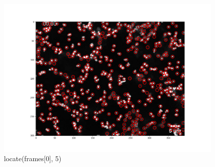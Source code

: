 \begin{enumerate}
\begin{figure}[H]
    \centering
    \includegraphics[scale=0.35]{Grafiken/trackpyBilder/locate(frames[0], 5).png}
    \caption{locate(frames[0], 5)}
    \label{fig:bild_label}
\end{figure} 


\end{enumerate}
